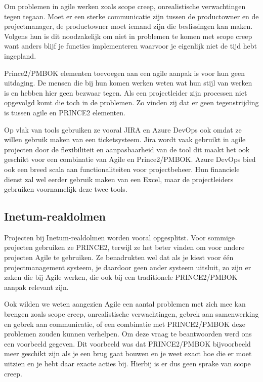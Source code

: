 \documentclass[dutch]{hogent-article}
\begin{document}
Om problemen in agile werken zoals scope creep, onrealistische verwachtingen tegen tegaan. Moet er een sterke communicatie zijn tussen de productowner en de projectmanager, de productowner moet iemand zijn die beslissingen kan maken. Volgens hun is dit noodzakelijk om niet in problemen te komen met scope creep want anders blijf je functies implementeren waarvoor je eigenlijk niet de tijd hebt ingepland. 
\newline

Prince2/PMBOK elementen toevoegen aan een agile aanpak is voor hun geen uitdaging. De mensen die bij hun komen werken weten wat hun stijl van werken is en hebben hier geen bezwaar tegen.
Als een projectleider zijn processen niet opgevolgd komt die toch in de problemen. Zo vinden zij dat er geen tegenstrijding is tussen agile en PRINCE2 elementen.
\newline

Op vlak van tools gebruiken ze vooral JIRA en Azure DevOps ook omdat ze willen gebruik maken van een ticketsysteem.
Jira wordt vaak gebruikt in agile projecten door de flexibiliteit en aanpasbaarheid van de tool dit maakt het ook geschikt voor een combinatie van Agile en Prince2/PMBOK.
Azure DevOps bied ook een breed scala aan functionaliteiten voor projectbeheer.
Hun financiele dienst zal wel eerder gebruik maken van een Excel, maar de projectleiders gebruiken voornamelijk deze twee tools.


\subsection{Inetum-realdolmen}
\label{ssec:interview-Inetum-realdolmen}
Projecten bij Inetum-realdolmen worden vooral opgesplitst. Voor sommige projecten gebruiken ze PRINCE2, terwijl ze het beter vinden om voor andere projecten Agile te gebruiken. Ze benadrukten wel dat als je kiest voor één projectmanagement systeem, je daardoor geen ander systeem uitsluit, zo zijn er zaken die bij Agile werken, die ook bij een traditionele PRINCE2/PMBOK aanpak relevant zijn. 
\newline

Ook wilden we weten aangezien Agile een aantal problemen met zich mee kan brengen zoals scope creep, onrealistische verwachtingen, gebrek aan samenwerking en gebrek aan communicatie, of een combinatie met PRINCE2/PMBOK deze problemen zouden kunnen verhelpen. Om deze vraag te beantwoorden werd ons een voorbeeld gegeven. Dit voorbeeld was dat PRINCE2/PMBOK bijvoorbeeld meer geschikt zijn als je een brug gaat bouwen en je weet exact hoe die er moet uitzien en je hebt daar exacte acties bij. Hierbij is er dus geen sprake van scope creep. 
\newline
\end{document}
